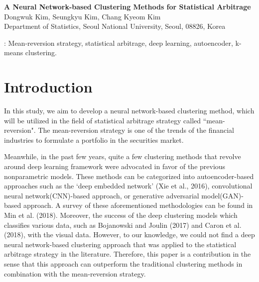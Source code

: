 \documentclass[11pt]{article}
\begin{document}
\begin{center}
{\bf\LARGE A Neural Network-based Clustering Methods for Statistical Arbitrage}
\vspace{.5cm}\\
 Dongwuk Kim, Seungkyu Kim, Chang Kyeom Kim \\
Department of Statistics, Seoul National University, Seoul, 08826,
Korea\\
\end{center}


\begin{abstract}
This paper aims to propose the deep neural network-based clustering scheme that can be applied to boost the performance of statistical arbitrage strategies, such as the mean-reversion strategy. The performance of the `deep clustering' model was compared against the traditional k-means clustering method, as well as the vendor-classified cluster, with the Sharpe ratio as a measure of performance. Although the deep clustering-based model outperforms that of k-means clustering, there still is room for improvement, which can be interesting future works.
\end{abstract}

: Mean-reversion strategy, statistical arbitrage, deep learning, autoencoder, k-means clustering.



\section{Introduction}

In this study, we aim to develop a neural network-based clustering method, which will be utilized in the field of statistical arbitrage strategy called ``mean-reversion". The mean-reversion strategy is one of the trends of the financial industries to formulate a portfolio in the securities market. %

Meanwhile, in the past few years, quite a few clustering methods that revolve around deep learning framework were advocated in favor of the previous nonparametric models. These methods can be categorized into autoencoder-based approaches such as the `deep embedded network' (Xie et al., 2016), convolutional neural network(CNN)-based approach, or generative adversarial model(GAN)-based approach. A survey of these aforementioned methodologies can be found in Min et al. (2018). Moreover, the success of the deep clustering models which classifies various data, such as  Bojanowski and Joulin (2017) and Caron et al. (2018), with the visual data. However, to our knowledge, we could not find a deep neural network-based clustering approach that was applied to the statistical arbitrage strategy in the literature. Therefore, this paper is a contribution in the sense that this approach can outperform the traditional clustering methods in combination with the mean-reversion strategy.
\end{document}
